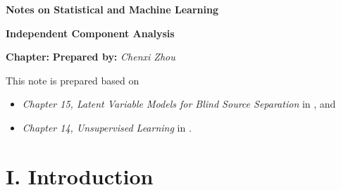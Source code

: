 \documentclass[12pt]{article}
\newcommand{\titlebox}[4]{
\begin{tcolorbox}[colback = blue!5!white!95, colframe = blue!70!black
]
  \noindent \textbf{ #1 } \hfill \textit{#2} 
  \begin{center}
  	 \LARGE{\textbf{#3}}
  \end{center}
\textbf{Chapter:} \textit{\text{#4}} \hfill \textbf{Prepared by:} \textit{Chenxi Zhou}
\end{tcolorbox}
}
\begin{document}
\thispagestyle{plain}
\titlebox{Notes on Statistical and Machine Learning}{}{Independent Component Analysis}{25}

\vspace{10pt} 

This note is prepared based on 
\begin{itemize}
	\item \textit{Chapter 15, Latent Variable Models for Blind Source Separation} in \textcite{Izenman2009-jk}, and 
	\item \textit{Chapter 14, Unsupervised Learning} in \textcite{Friedman2001-np}. 
\end{itemize}


\section*{I. Introduction}
\end{document}

